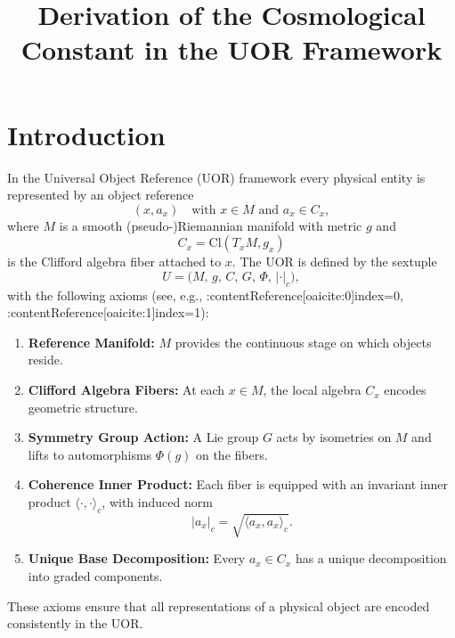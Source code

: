 \documentclass[12pt]{article}
\begin{document}
\title{Derivation of the Cosmological Constant in the UOR Framework}
\author{ }
\date{}
\maketitle

\section*{Introduction}
In the Universal Object Reference (UOR) framework every physical entity is represented by an object reference
\[
(x, a_x) \quad \text{with } x\in M \text{ and } a_x\in C_x,
\]
where \(M\) is a smooth (pseudo-)Riemannian manifold with metric \(g\) and 
\[
C_x = \mathrm{Cl}(T_xM, g_x)
\]
is the Clifford algebra fiber attached to \(x\). The UOR is defined by the sextuple
\[
U = \Big( M,\, g,\, C,\, G,\, \Phi,\, \lvert \cdot \rvert_c \Big),
\]
with the following axioms (see, e.g., :contentReference[oaicite:0]{index=0}, :contentReference[oaicite:1]{index=1}):
\begin{enumerate}
    \item \textbf{Reference Manifold:} \(M\) provides the continuous stage on which objects reside.
    \item \textbf{Clifford Algebra Fibers:} At each \(x\in M\), the local algebra \(C_x\) encodes geometric structure.
    \item \textbf{Symmetry Group Action:} A Lie group \(G\) acts by isometries on \(M\) and lifts to automorphisms \(\Phi(g)\) on the fibers.
    \item \textbf{Coherence Inner Product:} Each fiber is equipped with an invariant inner product \(\langle \cdot,\cdot \rangle_c\), with induced norm
    \[
    \lvert a_x\rvert_c = \sqrt{\langle a_x,a_x\rangle_c}.
    \]
    \item \textbf{Unique Base Decomposition:} Every \(a_x\in C_x\) has a unique decomposition into graded components.
\end{enumerate}
These axioms ensure that all representations of a physical object are encoded consistently in the UOR.
\end{document}
